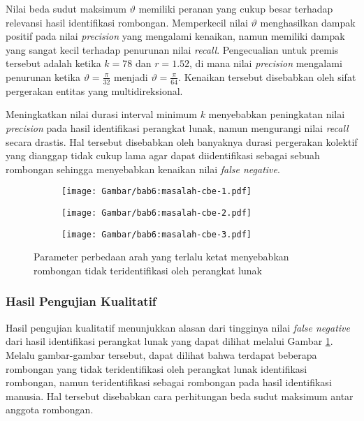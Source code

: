 Nilai beda sudut maksimum $\vartheta$ memiliki peranan yang cukup besar terhadap relevansi hasil identifikasi rombongan. Memperkecil nilai $\vartheta$ menghasilkan dampak positif pada nilai \textit{precision} yang mengalami kenaikan, namun memiliki dampak yang sangat kecil terhadap penurunan nilai \textit{recall}. Pengecualian untuk premis tersebut adalah ketika $k = 78$ dan $r = 1.52$, di mana nilai \textit{precision} mengalami penurunan ketika $\vartheta = \frac{\pi}{32}$ menjadi $\vartheta = \frac{\pi}{64}$. Kenaikan tersebut disebabkan oleh sifat pergerakan entitas yang multidireksional.

Meningkatkan nilai durasi interval minimum $k$ menyebabkan peningkatan nilai \textit{precision} pada hasil identifikasi perangkat lunak, namun mengurangi nilai \textit{recall} secara drastis. Hal tersebut disebabkan oleh banyaknya durasi pergerakan kolektif yang dianggap tidak cukup lama agar dapat diidentifikasi sebagai sebuah rombongan sehingga menyebabkan kenaikan nilai \textit{false negative}. 

\begin{figure}
    \centering
    \captionsetup{width=.75\textwidth}
    \begin{subfigure}[t]{0.25\textwidth}
        \centering
        \texttt{[image: Gambar/bab6:masalah-cbe-1.pdf]}
    \end{subfigure}
    \begin{subfigure}[t]{0.25\textwidth}
        \centering
        \texttt{[image: Gambar/bab6:masalah-cbe-2.pdf]}
    \end{subfigure}
    \begin{subfigure}[t]{0.25\textwidth}
        \centering
        \texttt{[image: Gambar/bab6:masalah-cbe-3.pdf]}
    \end{subfigure}
    \caption[Masalah identifikasi pada data CBE]{Parameter perbedaan arah yang terlalu ketat menyebabkan rombongan tidak teridentifikasi oleh perangkat lunak}
    \label{bab6:masalah-cbe}
\end{figure}

\subsubsection{Hasil Pengujian Kualitatif}
\label{subsub:sec:cbe-qualitative}

Hasil pengujian kualitatif menunjukkan alasan dari tingginya nilai \textit{false negative} dari hasil identifikasi perangkat lunak yang dapat dilihat melalui Gambar \ref{bab6:masalah-cbe}. Melalu gambar-gambar tersebut, dapat dilihat bahwa terdapat beberapa rombongan yang tidak teridentifikasi oleh perangkat lunak identifikasi rombongan, namun teridentifikasi sebagai rombongan pada hasil identifikasi manusia. Hal tersebut disebabkan cara perhitungan beda sudut maksimum antar anggota rombongan.

